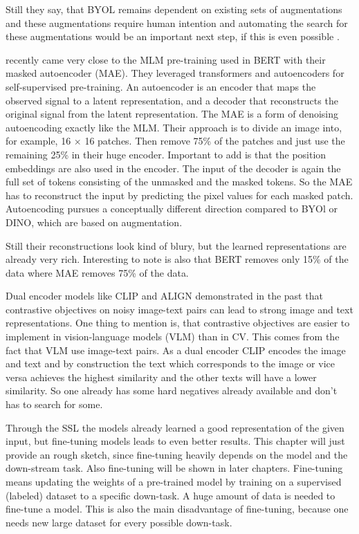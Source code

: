 \documentclass[
]{krantz}
\begin{document}
Still they say, that BYOL remains dependent on existing sets of augmentations and these augmentations require human intention and automating the search for these augmentations would be an important next step, if this is even possible \citep{grill2020bootstrap}.

\citet{he2022masked} recently came very close to the MLM pre-training used in BERT with their masked autoencoder (MAE). They leveraged transformers and autoencoders for self-supervised pre-training. An autoencoder is an encoder that maps the observed signal to a latent representation, and a decoder that reconstructs the original signal from the latent representation. The MAE is a form of denoising autoencoding exactly like the MLM. Their approach is to divide an image into, for example, 16 \(\times\) 16 patches. Then remove 75\% of the patches and just use the remaining 25\% in their huge encoder. Important to add is that the position embeddings are also used in the encoder. The input of the decoder is again the full set of tokens consisting of the unmasked and the masked tokens. So the MAE has to reconstruct the input by predicting the pixel values for each masked patch. Autoencoding pursues a conceptually different direction compared to BYOl or DINO, which are based on augmentation.

Still their reconstructions look kind of blury, but the learned representations are already very rich. Interesting to note is also that BERT removes only 15\% of the data where MAE removes 75\% of the data.

Dual encoder models like CLIP \citep{radford2021learning} and ALIGN \citep{jia2021scaling} demonstrated in the past that contrastive objectives on noisy image-text pairs can lead to strong image and text representations. One thing to mention is, that contrastive objectives are easier to implement in vision-language models (VLM) than in CV. This comes from the fact that VLM use image-text pairs. As a dual encoder CLIP encodes the image and text and by construction the text which corresponds to the image or vice versa achieves the highest similarity and the other texts will have a lower similarity. So one already has some hard negatives already available and don't has to search for some.

Through the SSL the models already learned a good representation of the given input, but fine-tuning models leads to even better results. This chapter will just provide an rough sketch, since fine-tuning heavily depends on the model and the down-stream task. Also fine-tuning will be shown in later chapters. Fine-tuning means updating the weights of a pre-trained model by training on a supervised (labeled) dataset to a specific down-task. A huge amount of data is needed to fine-tune a model. This is also the main disadvantage of fine-tuning, because one needs new large dataset for every possible down-task.
\end{document}
